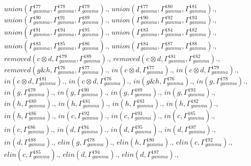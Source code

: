 \documentclass[a4paper, 11pt]{article}
\begin{document}
$union(\Gamma_{gamma}^{177}, \Gamma_{gamma}^{178}, \Gamma_{gamma}^{179}).$, $union(\Gamma_{gamma}^{177}, \Gamma_{gamma}^{180}, \Gamma_{gamma}^{181}).$, $union(\Gamma_{gamma}^{190}, \Gamma_{gamma}^{191}, \Gamma_{gamma}^{189}).$, $union(\Gamma_{gamma}^{190}, \Gamma_{gamma}^{192}, \Gamma_{gamma}^{193}).$, $union(\Gamma_{gamma}^{191}, \Gamma_{gamma}^{194}, \Gamma_{gamma}^{195}).$, $union(\Gamma_{gamma}^{183}, \Gamma_{gamma}^{184}, \Gamma_{gamma}^{182}).$, $union(\Gamma_{gamma}^{183}, \Gamma_{gamma}^{185}, \Gamma_{gamma}^{186}).$, $union(\Gamma_{gamma}^{184}, \Gamma_{gamma}^{187}, \Gamma_{gamma}^{188}).$, $removed(c \otimes d, \Gamma_{gamma}^{179}, \Gamma_{gamma}^{189}).$, $removed(c \otimes d, \Gamma_{gamma}^{181}, \Gamma_{gamma}^{182}).$, $removed(g \binampersand h, \Gamma_{gamma}^{176}, \Gamma_{gamma}^{177}).$, $in(c \otimes d, \Gamma_{gamma}^{177}).$, $in(c \otimes d, \Gamma_{gamma}^{179}).$, $in(c \otimes d, \Gamma_{gamma}^{181}).$, $in(c \otimes d, \Gamma_{gamma}^{176}).$, $in(g \binampersand h, \Gamma_{gamma}^{176}).$, $in(g, \Gamma_{gamma}^{178}).$, $in(g, \Gamma_{gamma}^{179}).$, $in(g, \Gamma_{gamma}^{190}).$, $in(g, \Gamma_{gamma}^{189}).$, $in(g, \Gamma_{gamma}^{193}).$, $in(h, \Gamma_{gamma}^{180}).$, $in(h, \Gamma_{gamma}^{181}).$, $in(h, \Gamma_{gamma}^{183}).$, $in(h, \Gamma_{gamma}^{182}).$, $in(h, \Gamma_{gamma}^{186}).$, $in(c, \Gamma_{gamma}^{192}).$, $in(c, \Gamma_{gamma}^{193}).$, $in(c, \Gamma_{gamma}^{185}).$, $in(c, \Gamma_{gamma}^{186}).$, $in(d, \Gamma_{gamma}^{194}).$, $in(d, \Gamma_{gamma}^{195}).$, $in(d, \Gamma_{gamma}^{187}).$, $in(d, \Gamma_{gamma}^{188}).$, $elin(g, \Gamma_{gamma}^{178}).$, $elin(h, \Gamma_{gamma}^{180}).$, $elin(c, \Gamma_{gamma}^{192}).$, $elin(c, \Gamma_{gamma}^{185}).$, $elin(d, \Gamma_{gamma}^{194}).$, $elin(d, \Gamma_{gamma}^{187}).$, 
\end{document}
